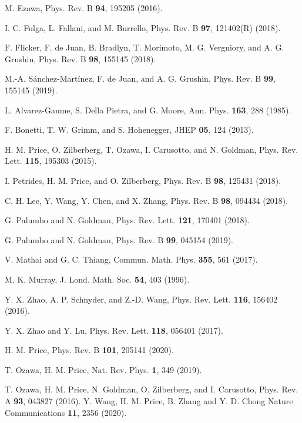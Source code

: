 \documentclass[twocolumn,prl,10pt,superscriptaddress]{revtex4}
\begin{document}
\begin{thebibliography}{99}
M. Ezawa, Phys. Rev. B {\bf 94}, 195205 (2016).

I. C. Fulga, L. Fallani, and M. Burrello,
Phys. Rev. B \textbf{97}, 121402(R) (2018).

F. Flicker, F. de Juan, B. Bradlyn, T. Morimoto, M. G. Vergniory, and A. G. Grushin,
Phys. Rev. B \textbf{98}, 155145 (2018).


M.-A. Sánchez-Martínez, F. de Juan, and A. G. Grushin,
Phys. Rev. B \textbf{99}, 155145 (2019).




L. Alvarez-Gaume, S. Della Pietra, and G. Moore, Ann. Phys. \textbf{163}, 288 (1985).

F. Bonetti, T. W. Grimm, and S. Hohenegger, JHEP \textbf{05}, 124 (2013).

H. M. Price, O. Zilberberg, T. Ozawa, I. Carusotto, and N. Goldman,
Phys. Rev. Lett. \textbf{115}, 195303 (2015).


I. Petrides, H. M. Price, and O. Zilberberg,
Phys. Rev. B \textbf{98}, 125431 (2018).

C. H. Lee, Y. Wang, Y. Chen, and X. Zhang,
Phys. Rev. B \textbf{98}, 094434 (2018).



G. Palumbo and N. Goldman, Phys. Rev. Lett. {\bf 121}, 170401 (2018).

G. Palumbo and N. Goldman,
Phys. Rev. B \textbf{99}, 045154 (2019).


V. Mathai and G. C. Thiang, Commun. Math. Phys. {\bf 355},
561 (2017).

M. K. Murray, J. Lond. Math. Soc. {\bf 54}, 403 (1996).



Y. X. Zhao, A. P. Schnyder, and Z.-D. Wang, Phys. Rev. Lett. {\bf 116}, 156402 (2016).


Y. X. Zhao and Y. Lu, Phys. Rev. Lett. {\bf 118}, 056401 (2017).

H. M. Price, Phys. Rev. B {\bf 101}, 205141 (2020).

T. Ozawa, H. M. Price, Nat. Rev. Phys. {\bf 1}, 349 (2019).

T. Ozawa, H. M. Price, N. Goldman, O. Zilberberg, and I. Carusotto,
Phys. Rev. A {\bf 93}, 043827 (2016).
Y. Wang, H. M. Price, B. Zhang and Y. D. Chong
Nature Communications {\bf 11}, 2356 (2020).


\end{thebibliography}
\end{document}
